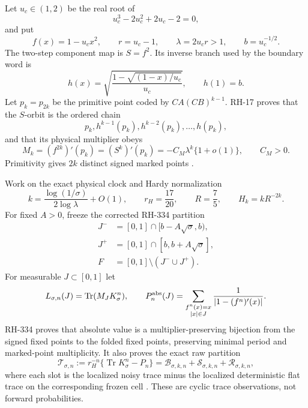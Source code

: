 \documentclass[11pt]{article}
\theoremstyle{remark}
\newcommand{\cB}{\mathcal B}
\newcommand{\cS}{\mathcal S}
\newcommand{\cR}{\mathcal R}
\newcommand{\cT}{\mathcal T}
\begin{document}
Let $u_c\in(1,2)$ be the real root of
\begin{equation}\label{eq:uc}
 u_c^3-2u_c^2+2u_c-2=0,
\end{equation}
and put
\begin{equation}\label{eq:physical}
 f(x)=1-u_cx^2,\qquad r=u_c-1,\qquad
 \lambda=2u_cr>1,\qquad b=u_c^{-1/2}.
\end{equation}
The two-step component map is $S=f^2$.  Its inverse branch used by the
boundary word is
\begin{equation}\label{eq:h}
 h(x)=\sqrt{\frac{1-\sqrt{(1-x)/u_c}}{u_c}},
 \qquad h(1)=b.
\end{equation}
Let $p_k=p_{2k}$ be the primitive point coded by $CA(CB)^{k-1}$.  RH-17
proves that the $S$-orbit is the ordered chain
\begin{equation}\label{eq:S-chain}
 p_k,h^{k-1}(p_k),h^{k-2}(p_k),\ldots,h(p_k),
\end{equation}
and that its physical multiplier obeys
\begin{equation}\label{eq:M}
 M_k=(f^{2k})'(p_k)=(S^k)'(p_k)
 =-C_M\lambda^k\{1+o(1)\},\qquad C_M>0.
\end{equation}
Primitivity gives $2k$ distinct signed marked points
\citep{WangLongCycle2026,WangBoundaryMonodromy2026}.

Work on the exact physical clock and Hardy normalization
\begin{equation}\label{eq:clock}
 k=\frac{\log(1/\sigma)}{2\log\lambda}+O(1),\qquad
 r_H=\frac{17}{20},\qquad R=\frac75,\qquad
 H_k=kR^{-2k}.
\end{equation}
For fixed $A>0$, freeze the corrected RH-334 partition
\begin{align}
 J^-&=[0,1]\cap[b-A\sqrt\sigma,b),\label{eq:Jminus}\\
 J^+&=[0,1]\cap[b,b+A\sqrt\sigma],\label{eq:Jplus}\\
 F&=[0,1]\setminus(J^-\cup J^+).\label{eq:F}
\end{align}
For measurable $J\subset[0,1]$ let
\begin{equation}\label{eq:localized}
 L_{\sigma,n}(J)=\operatorname{Tr}(M_JK_\sigma^n),\qquad
 P_n^{\rm abs}(J)=
 \sum_{\substack{f^n(x)=x\\ |x|\in J}}
 \frac1{|1-(f^n)'(x)|}.
\end{equation}
RH-334 proves that absolute value is a multiplier-preserving bijection from
the signed fixed points to the folded fixed points, preserving minimal period
and marked-point multiplicity.  It also proves the exact raw partition
\begin{equation}\label{eq:raw}
 \cT_{\sigma,n}:=r_H^{-n}
 \{\operatorname{Tr}K_\sigma^n-P_n\}
 =\cB_{\sigma,k,n}+\cS_{\sigma,k,n}+\cR_{\sigma,k,n},
\end{equation}
where each slot is the localized noisy trace minus the localized
deterministic flat trace on the corresponding frozen cell
\citep{WangObservation2026}.  These are cyclic trace observations, not
forward probabilities.
\end{document}
